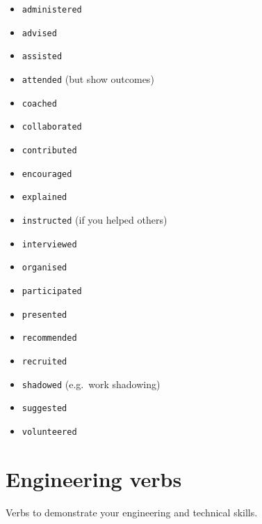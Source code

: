 \documentclass[
]{book}
\providecommand{\tightlist}{%
  \setlength{\itemsep}{0pt}\setlength{\parskip}{0pt}}
\begin{document}
\begin{itemize}
\tightlist
\item
  \texttt{administered}
\item
  \texttt{advised}
\item
  \texttt{assisted}
\item
  \texttt{attended} (but show outcomes)
\item
  \texttt{coached}
\item
  \texttt{collaborated}
\item
  \texttt{contributed}
\item
  \texttt{encouraged}
\item
  \texttt{explained}
\item
  \texttt{instructed} (if you helped others)
\item
  \texttt{interviewed}
\item
  \texttt{organised}
\item
  \texttt{participated}
\item
  \texttt{presented}
\item
  \texttt{recommended}
\item
  \texttt{recruited}
\item
  \texttt{shadowed} (e.g.~work shadowing)
\item
  \texttt{suggested}
\item
  \texttt{volunteered}
\end{itemize}

\hypertarget{engineering}{%
\section{Engineering verbs}\label{engineering}}

Verbs to demonstrate your engineering and technical skills.
\end{document}
